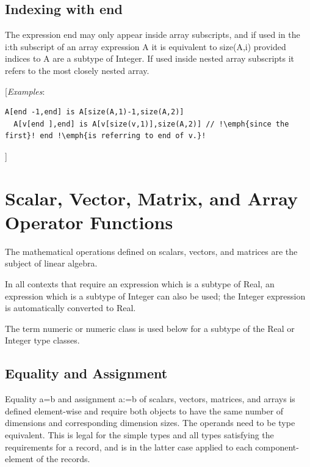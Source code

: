 \documentclass[10pt,a4paper]{report}
\def\doublelabel#1{\label{#1}}
\begin{document}
\subsection{Indexing with end}\doublelabel{indexing-with-end}

The expression end may only appear inside array subscripts, and if used
in the i:th subscript of an array expression A it is equivalent to
size(A,i) provided indices to A are a subtype of Integer. If used inside
nested array subscripts it refers to the most closely nested array.

{[}\emph{Examples}:

\begin{lstlisting}[language=modelica, escapechar=!]
  A[end -1,end] is A[size(A,1)-1,size(A,2)]
  A[v[end ],end] is A[v[size(v,1)],size(A,2)] // !\emph{since the first}! end !\emph{is referring to end of v.}!
\end{lstlisting}
{]}

\section{Scalar, Vector, Matrix, and Array Operator Functions}\doublelabel{scalar-vector-matrix-and-array-operator-functions}

The mathematical operations defined on scalars, vectors, and matrices
are the subject of linear algebra.

In all contexts that require an expression which is a subtype of Real,
an expression which is a subtype of Integer can also be used; the
Integer expression is automatically converted to Real.

The term numeric or numeric class is used below for a subtype of the
Real or Integer type classes.

\subsection{Equality and Assignment}\doublelabel{equality-and-assignment}

Equality a=b and assignment a:=b of scalars, vectors, matrices, and
arrays is defined element-wise and require both objects to have the same
number of dimensions and corresponding dimension sizes. The operands
need to be type equivalent. This is legal for the simple types and all
types satisfying the requirements for a record, and is in the latter
case applied to each component-element of the records.
\end{document}
